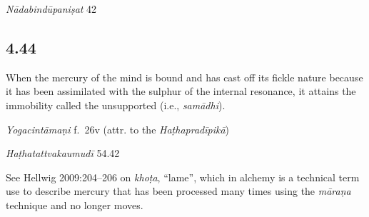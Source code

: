 \begin{ekdosis}
\begin{testimonia}[hp04_043]
\emph{Nādabindūpaniṣat} 42
\begin{versinnote}
\end{versinnote}
\end{testimonia}


\subsection*{4.44}
\begin{translation}[hp04_044]
When the mercury of the mind is bound and has cast off its fickle nature because it has been assimilated with the sulphur of the internal resonance, it attains the immobility called the unsupported (i.e., \textit{samādhi}).
\end{translation}


\begin{testimonia}[hp04_044]
\emph{Yogacintāmaṇi} f.~26v (attr. to the \emph{Haṭhapradīpikā})
\begin{versinnote}
\end{versinnote}

\emph{Haṭhatattvakaumudī} 54.42
\begin{versinnote}
\end{versinnote}
\end{testimonia}

\begin{philcomm}[hp04_044]
See Hellwig 2009:204–206 on \emph{khoṭa}, “lame”, which in alchemy is a technical term use to describe mercury that has been processed many times using the \emph{māraṇa} technique and no longer moves.
\end{philcomm}


\end{ekdosis}
